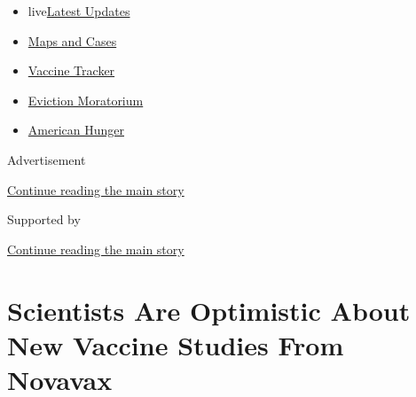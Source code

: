 \begin{itemize}
\tightlist
\item
  live\href{https://www.nytimes3xbfgragh.onion/2020/09/05/world/coronavirus-covid.html?name=styln-coronavirus-national\&region=TOP_BANNER\&block=storyline_menu_recirc\&action=click\&pgtype=Article\&impression_id=4ca13ea0-efbb-11ea-99e8-0d08d99b0aa0\&variant=undefined}{Latest
  Updates}
\item
  \href{https://www.nytimes3xbfgragh.onion/interactive/2020/us/coronavirus-us-cases.html?name=styln-coronavirus-national\&region=TOP_BANNER\&block=storyline_menu_recirc\&action=click\&pgtype=Article\&impression_id=4ca13ea1-efbb-11ea-99e8-0d08d99b0aa0\&variant=undefined}{Maps
  and Cases}
\item
  \href{https://www.nytimes3xbfgragh.onion/interactive/2020/science/coronavirus-vaccine-tracker.html?name=styln-coronavirus-national\&region=TOP_BANNER\&block=storyline_menu_recirc\&action=click\&pgtype=Article\&impression_id=4ca13ea2-efbb-11ea-99e8-0d08d99b0aa0\&variant=undefined}{Vaccine
  Tracker}
\item
  \href{https://www.nytimes3xbfgragh.onion/2020/09/02/your-money/eviction-moratorium-covid.html?name=styln-coronavirus-national\&region=TOP_BANNER\&block=storyline_menu_recirc\&action=click\&pgtype=Article\&impression_id=4ca13ea3-efbb-11ea-99e8-0d08d99b0aa0\&variant=undefined}{Eviction
  Moratorium}
\item
  \href{https://www.nytimes3xbfgragh.onion/interactive/2020/09/02/magazine/food-insecurity-hunger-us.html?name=styln-coronavirus-national\&region=TOP_BANNER\&block=storyline_menu_recirc\&action=click\&pgtype=Article\&impression_id=4ca13ea4-efbb-11ea-99e8-0d08d99b0aa0\&variant=undefined}{American
  Hunger}
\end{itemize}

Advertisement

\protect\hyperlink{after-top}{Continue reading the main story}

Supported by

\protect\hyperlink{after-sponsor}{Continue reading the main story}

\hypertarget{scientists-are-optimistic-about-new-vaccine-studies-from-novavax}{%
\section{Scientists Are Optimistic About New Vaccine Studies From
Novavax}\label{scientists-are-optimistic-about-new-vaccine-studies-from-novavax}}

